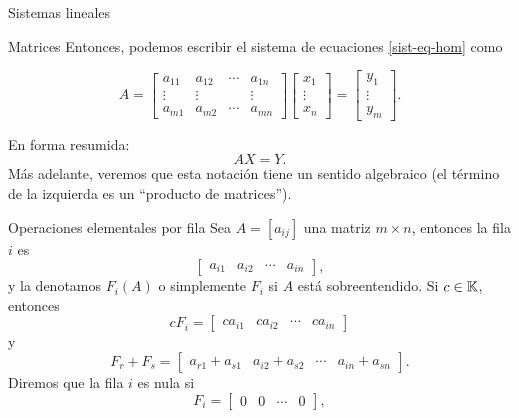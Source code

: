 \begin{chapter}{Sistemas lineales}
\begin{section}{Matrices}
            Entonces, podemos escribir el sistema de ecuaciones \eqref{sist-eq-hom} como
        
            \begin{equation}\label{sist-eq-2}
                A = \begin{bmatrix}
                a_{11}& a_{12}& \cdots &a_{1n} \\
                \vdots&\vdots  &  &\vdots \\
                a_{m1} &a_{m2}&\cdots &a_{mn}
                \end{bmatrix}
                \begin{bmatrix}
                x_1  \\ \vdots \\  x_n
                \end{bmatrix} = 
                \begin{bmatrix}
                y_1 \\ \vdots \\ y_m
                \end{bmatrix}.
            \end{equation}
            
             En forma resumida:
            \begin{equation}\label{sis-eq-hom-2}
            AX = Y.
            \end{equation}
            Más adelante, veremos que esta notación tiene un sentido algebraico (el término de la izquierda es un ``producto de matrices'').
            
            \begin{subsection}{Operaciones elementales por fila}
                Sea $A = [a_{ij}]$ una matriz $m \times  n$,  entonces la fila $i$ es 
                $$
                \begin{bmatrix} a_{i1}& a_{i2}& \cdots &a_{in} 	\end{bmatrix},
                $$
                y la denotamos $F_i(A)$ o simplemente $F_i$ si $A$ está sobreentendido. Si $c\in \mathbb K$,  entonces 
                $$
                cF_i = \begin{bmatrix} ca_{i1}& ca_{i2}& \cdots &ca_{in} 	\end{bmatrix}
                $$
                y
                $$
                F_r + F_s = \begin{bmatrix} a_{r1}+a_{s1}& a_{i2}+a_{s2}& \cdots &a_{in}+a_{sn} 	\end{bmatrix}.
                $$ 
                Diremos que la fila $i$ es nula si 
                $$
                F_i = \begin{bmatrix} 0& 0& \cdots &0 	\end{bmatrix},
                $$
                

\end{subsection}
\end{section}
\end{chapter}
